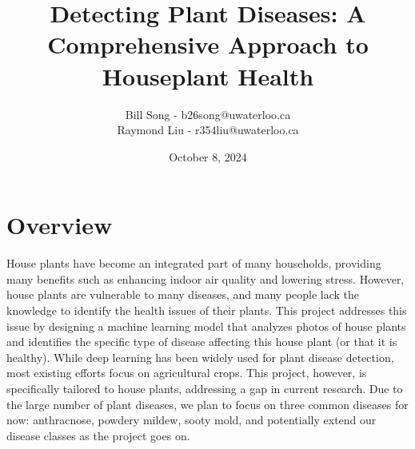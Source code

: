 \documentclass[12pt]{article}
\title{%
  Detecting Plant Diseases: A Comprehensive Approach to Houseplant Health }
\author{Bill Song - b26song@uwaterloo.ca\\Raymond Liu - r354liu@uwaterloo.ca}
\date{October 8, 2024}
\begin{document}
\maketitle



\section{Overview}

House plants have become an integrated part of many households, providing many benefits such as enhancing indoor air quality and lowering stress. However, house plants are vulnerable to many diseases, and many people lack the knowledge to identify the health issues of their plants. This project addresses this issue by designing a machine learning model that analyzes photos of house plants and identifies the specific type of disease affecting this house plant (or that it is healthy). While deep learning has been widely used for plant disease detection, most existing efforts focus on agricultural crops. This project, however, is specifically tailored to house plants, addressing a gap in current research. Due to the large number of plant diseases, we plan to focus on three common diseases for now: anthracnose, powdery mildew, sooty mold, and potentially extend our disease classes as the project goes on. 
\end{document}
